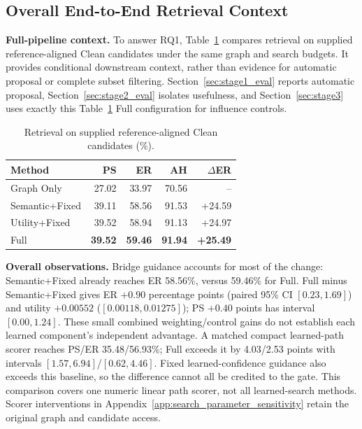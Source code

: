 \documentclass{article} %
\newcommand{\rev}[1]{{\color{blue}#1}}
\begin{document}
\subsection{Overall End-to-End Retrieval Context}
\label{sec:overall}

\noindent\textbf{Full-pipeline context.}
To answer RQ1, Table~\ref{tab:overall_gain} compares retrieval on supplied reference-aligned Clean candidates under the same graph and search budgets. It provides conditional downstream context, rather than evidence for automatic proposal or complete subset filtering. Section~\ref{sec:stage1_eval} reports automatic proposal, Section~\ref{sec:stage2_eval} isolates usefulness, and Section~\ref{sec:stage3} uses exactly this Table~\ref{tab:overall_gain} Full configuration for influence controls.

\begin{table}
\vspace{-5pt}
\centering
\caption{Retrieval on supplied reference-aligned Clean candidates (\%).}
\label{tab:overall_gain}

\vspace{-3pt}
\small
\setlength{\tabcolsep}{3.8pt}
\renewcommand{\arraystretch}{1.05}

\begin{tabular}{lrrrr}
\toprule
\textbf{Method} &
\textbf{PS} &
\textbf{ER} &
\textbf{AH} &
\textbf{$\Delta$ER} \\
\midrule
Graph Only
& 27.02
& 33.97
& 70.56
& -- \\

Semantic+Fixed
& 39.11
& 58.56
& 91.53
& +24.59 \\

Utility+Fixed
& 39.52
& 58.94
& 91.13
& +24.97 \\

Full
& \textbf{39.52}
& \textbf{59.46}
& \textbf{91.94}
& \textbf{+25.49} \\
\bottomrule
\end{tabular}

\vspace{-5pt}
\end{table}
\noindent\textbf{Overall observations.} Bridge guidance accounts for most of the change: Semantic+Fixed already reaches ER 58.56\%, versus 59.46\% for Full. \rev{Full minus Semantic+Fixed gives ER $+0.90$ percentage points (paired 95\% CI $[0.23,1.69]$) and utility $+0.00552$ ($[0.00118,0.01275]$); PS $+0.40$ points has interval $[0.00,1.24]$. These small combined weighting/control gains do not establish each learned component's independent advantage.} \rev{A matched compact learned-path scorer reaches PS/ER 35.48/56.93\%; Full exceeds it by 4.03/2.53 points with intervals $[1.57,6.94]$/$[0.62,4.46]$. Fixed learned-confidence guidance also exceeds this baseline, so the difference cannot all be credited to the gate.} This comparison covers one numeric linear path scorer, not all learned-search methods. Scorer interventions in Appendix~\ref{app:search_parameter_sensitivity} retain the original graph and candidate access.
\end{document}
